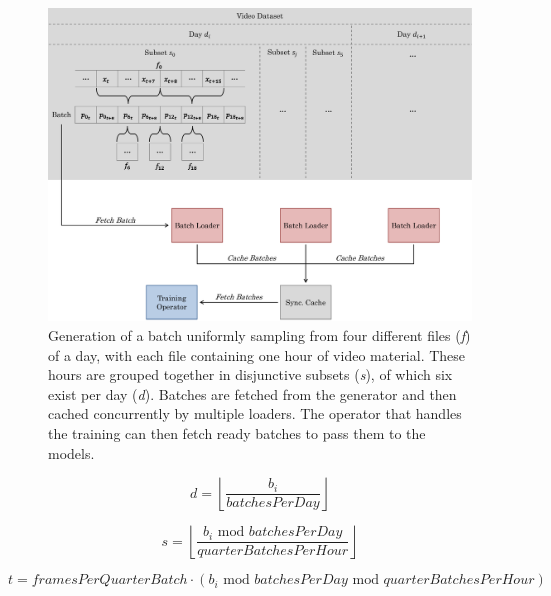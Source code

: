 \begin{figure}
	\centering
	\includegraphics[width=1\textwidth]{graphics/anomalyDetection/ads/batchGeneration/uniform/uniformBatchGenerator.pdf}
  \caption[Creation of a batch sampling from different hours of a day.]{Generation of a batch uniformly sampling from four different files (\textit{f}) of a day, with each file containing one hour of video material. These hours are grouped together in disjunctive subsets (\textit{s}), of which six exist per day (\textit{d}). Batches are fetched from the generator and then cached concurrently by multiple loaders. The operator that handles the training can then fetch ready batches to pass them to the models.}
  \label{fig:uniform_bgen}
\end{figure}

\begin{equation} \label{eq:day}
d = \left \lfloor {\frac{b_i}{batchesPerDay}} \right \rfloor
\end{equation}

\begin{equation} \label{eq:subset}
s = \left \lfloor {\frac{b_i \text{ mod } batchesPerDay}{quarterBatchesPerHour}} \right \rfloor
\end{equation}

\begin{equation} \label{eq:offset}
t = framesPerQuarterBatch \cdot (b_i  \text{ mod } batchesPerDay  \text{ mod } quarterBatchesPerHour)
\end{equation}

